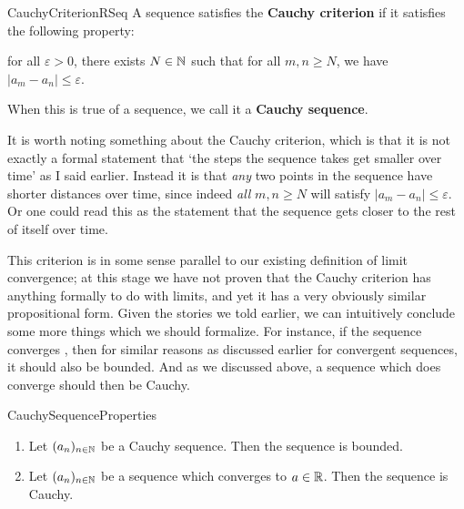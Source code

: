 \documentclass[11pt]{article}
\begin{document}
\begin{label definition}{CauchyCriterionRSeq}
A sequence satisfies the \textbf{Cauchy criterion} if it satisfies the following property: 

for all $\varepsilon > 0$, there exists $N \in \mathbb{N}$ such that for all $m,n \ge N$, we have $|a_m - a_n| \le \varepsilon$.

When this is true of a sequence, we call it a \textbf{Cauchy sequence}.
\end{label definition}

It is worth noting something about the Cauchy criterion, which is that it is not exactly a formal statement that ‘the steps the sequence takes get smaller over time’ as I said earlier. Instead it is that \emph{any} two points in the sequence have shorter distances over time, since indeed \emph{all} $m,n \ge N$ will satisfy $|a_m - a_n| \le \varepsilon$. Or one could read this as the statement that the sequence gets closer to the rest of itself over time.

This criterion is in some sense parallel to our existing definition of limit convergence; at this stage we have not proven that the Cauchy criterion has anything formally to do with limits, and yet it has a very obviously similar propositional form. Given the stories we told earlier, we can intuitively conclude some more things which we should formalize. For instance, if the sequence converges , then for similar reasons as discussed earlier for convergent sequences, it should also be bounded. And as we discussed above, a sequence which does converge should then be Cauchy.

\begin{label proposition}{CauchySequenceProperties}
\begin{enumerate}
\item Let $(a_n)_{n\in \mathbb{N}}$ be a Cauchy sequence. Then the sequence is bounded.
\item Let $(a_n)_{n\in \mathbb{N}}$ be a sequence which converges to $a \in \mathbb{R}$. Then the sequence is Cauchy.
\end{enumerate}
\end{label proposition}
\end{document}
